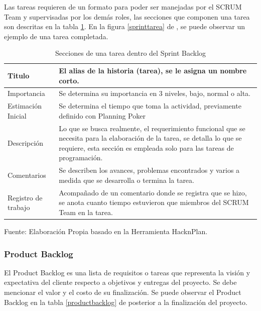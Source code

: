 Las tareas requieren de un formato para poder ser manejadas por el SCRUM Team y supervisadas por los demás roles, las secciones que componen una tarea son descritas en la tabla \ref{sprinttabla}. En la figura \ref{sprinttarea} de , se puede observar un ejemplo de una tarea completada.

\begin{table}[t!]
	\begin{center}
		\begin{tabular}{| m{4cm} | m{10cm} |  }
			\hline Titulo & El alias de la historia (tarea), se le asigna un nombre corto. \\ \hline
			 Importancia & Se determina su importancia en 3 niveles, bajo, normal o alta. \\ \hline
			 Estimación Inicial & Se determina el tiempo que toma la actividad, previamente definido con Planning Poker \\ \hline
			 Descripción & Lo que se busca realmente, el requerimiento funcional que se necesita para la elaboración de la tarea, se detalla lo que se requiere, esta sección es empleada solo para las tareas de programación. \\ \hline
			 Comentarios & Se describen los avances, problemas encontrados y varios a medida que se desarrolla o termina la tarea. \\ \hline
			Registro de trabajo  & Acompañado de un comentario donde se registra que se hizo, se anota cuanto tiempo estuvieron que miembros del SCRUM Team en la tarea. \\ \hline
		\end{tabular}
		\caption{Secciones de una tarea dentro del Sprint Backlog}
		\label{sprinttabla}
		\footnotesize Fuente: Elaboración Propia basado en la Herramienta HacknPlan.
	\end{center}
\end{table}

\subsubsection{Product Backlog}

El Product Backlog es una lista de requisitos o tareas que representa la visión y expectativa del cliente respecto a objetivos y entregas del proyecto. Se debe mencionar el valor y el costo de su finalización. Se puede observar el Product Backlog en la tabla \ref{productbacklog} de  posterior a la finalización del proyecto.

